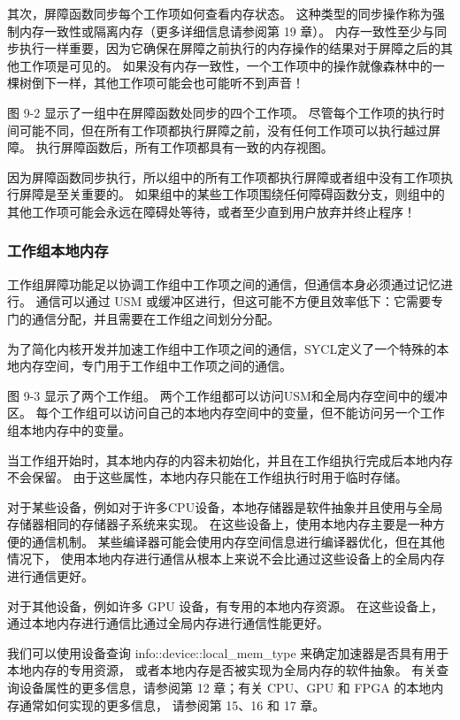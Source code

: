 其次，屏障函数同步每个工作项如何查看内存状态。 
这种类型的同步操作称为强制内存一致性或隔离内存（更多详细信息请参阅第 19 章）。 
内存一致性至少与同步执行一样重要，因为它确保在屏障之前执行的内存操作的结果对于屏障之后的其他工作项是可见的。 
如果没有内存一致性，一个工作项中的操作就像森林中的一棵树倒下一样，其他工作项可能会也可能听不到声音！

图 9-2 显示了一组中在屏障函数处同步的四个工作项。 
尽管每个工作项的执行时间可能不同，但在所有工作项都执行屏障之前，没有任何工作项可以执行越过屏障。 
执行屏障函数后，所有工作项都具有一致的内存视图。

因为屏障函数同步执行，所以组中的所有工作项都执行屏障或者组中没有工作项执行屏障是至关重要的。 
如果组中的某些工作项围绕任何障碍函数分支，则组中的其他工作项可能会永远在障碍处等待，或者至少直到用户放弃并终止程序！

\subsubsection{工作组本地内存}
工作组屏障功能足以协调工作组中工作项之间的通信，但通信本身必须通过记忆进行。 
通信可以通过 USM 或缓冲区进行，但这可能不方便且效率低下：它需要专门的通信分配，并且需要在工作组之间划分分配。

为了简化内核开发并加速工作组中工作项之间的通信，SYCL定义了一个特殊的本地内存空间，专门用于工作组中工作项之间的通信。

图 9-3 显示了两个工作组。 两个工作组都可以访问USM和全局内存空间中的缓冲区。 
每个工作组可以访问自己的本地内存空间中的变量，但不能访问另一个工作组本地内存中的变量。

当工作组开始时，其本地内存的内容未初始化，并且在工作组执行完成后本地内存不会保留。 
由于这些属性，本地内存只能在工作组执行时用于临时存储。

对于某些设备，例如对于许多CPU设备，本地存储器是软件抽象并且使用与全局存储器相同的存储器子系统来实现。 
在这些设备上，使用本地内存主要是一种方便的通信机制。 
某些编译器可能会使用内存空间信息进行编译器优化，但在其他情况下，
使用本地内存进行通信从根本上来说不会比通过这些设备上的全局内存进行通信更好。

对于其他设备，例如许多 GPU 设备，有专用的本地内存资源。 
在这些设备上，通过本地内存进行通信比通过全局内存进行通信性能更好。

我们可以使用设备查询 info::device::local\_mem\_type 来确定加速器是否具有用于本地内存的专用资源，
或者本地内存是否被实现为全局内存的软件抽象。 
有关查询设备属性的更多信息，请参阅第 12 章；有关 CPU、GPU 和 FPGA 的本地内存通常如何实现的更多信息，
请参阅第 15、16 和 17 章。

